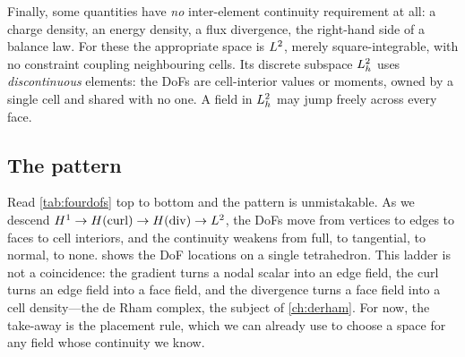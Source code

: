 Finally, some quantities have \emph{no} inter-element continuity requirement at all:
a charge density, an energy density, a flux divergence, the right-hand side of a
balance law. For these the appropriate space is $L^2$, merely square-integrable,
with no constraint coupling neighbouring cells. Its discrete subspace $L^2_h$ uses
\emph{discontinuous} elements: the DoFs are cell-interior values or moments, owned by
a single cell and shared with no one. A field in $L^2_h$ may jump freely across
every face.

\subsection{The pattern}

Read \cref{tab:fourdofs} top to bottom and the pattern is unmistakable. As we descend
$H^1 \to H(\mathrm{curl}) \to H(\mathrm{div}) \to L^2$, the DoFs move from vertices to edges to faces
to cell interiors, and the continuity weakens from full, to tangential, to normal, to
none.  shows the DoF locations on a single tetrahedron. This
ladder is not a coincidence: the gradient turns a nodal scalar into an edge field, the
curl turns an edge field into a face field, and the divergence turns a face field into
a cell density---the de Rham complex, the subject of \cref{ch:derham}. For now, the
take-away is the placement rule, which we can already use to choose a space for any
field whose continuity we know.

